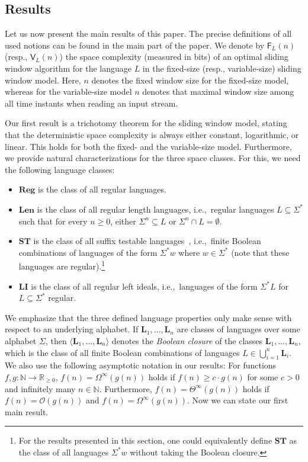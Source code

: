 \documentclass{article}\usepackage[a4paper,margin=20mm]{geometry}
\newcommand{\N}{\mathbb{N}}
\renewcommand{\O}{\mathcal{O}}
\newcommand{\F}{\mathsf{F}}
\newcommand{\V}{\mathsf{V}}
\newcommand{\Reg}{\mathbf{Reg}}
\newcommand{\Len}{\mathbf{Len}}
\newcommand{\LI}{\mathbf{LI}}
\newcommand{\ST}{\mathbf{ST}}
\renewcommand{\geq}{\geqslant}
\renewcommand{\ge}{\geq}
\newcommand{\Omegainf}{\Omega^{\scriptscriptstyle{\infty}}}
\newcommand{\Thetainf}{\Theta^{\scriptscriptstyle{\infty}}}
\begin{document}
\subsection{Results} \label{sec-results}

Let us now present the main results of this paper.
The precise definitions of all used notions can be found in the main part of the paper.
We denote by $\F_L(n)$ (resp., $\V_L(n)$) the space complexity (measured in bits) of an optimal sliding window algorithm
for the language $L$ in the fixed-size (resp., variable-size) sliding window model.
Here, $n$ denotes the fixed window size for the fixed-size model, whereas for 
the variable-size model $n$ denotes that maximal window
size among all time instants when reading an input stream.

Our first result is a trichotomy theorem for the sliding window model,
stating that the deterministic space complexity is always
either constant, logarithmic, or linear.
This holds for both the fixed- and the variable-size model.
Furthermore, we provide natural characterizations for the three space classes. For this, we need
the following language classes:
\begin{itemize}
\item $\Reg$ is the class of all regular languages.
\item $\Len$ is the class of all regular length languages, i.e.,~regular languages $L\subseteq \Sigma^*$
such that for every $n \geq 0$, either $\Sigma^n \subseteq L$ or $\Sigma^n \cap L = \emptyset$.
\item $\ST$ is the class of all suffix testable languages~\cite[Section~5.3]{Pin97}, i.e.,~finite Boolean combinations of languages of the form $\Sigma^* w$ where $w \in \Sigma^*$
(note that these languages are regular).\footnote{For the results presented in this section, one could equivalently define $\ST$ as the class of all languages $\Sigma^* w$ without taking the Boolean closure.}
\item $\LI$ is the class of all regular left ideals, i.e.,~languages of the form $\Sigma^* L$ for $L\subseteq \Sigma^*$
regular.
\end{itemize}
We emphasize that the three defined language properties
only make sense with respect to an underlying alphabet.
If $\mathbf{L}_1, \dots, \mathbf{L}_n$ are classes of languages over some alphabet $\Sigma$,
then $\langle \mathbf{L}_1, \dots, \mathbf{L}_n \rangle$
denotes the {\em Boolean closure} of the classes $\mathbf{L}_1, \dots, \mathbf{L}_n$, which is
the class of all finite Boolean combinations of languages $L \in \bigcup_{i=1}^n\mathbf{L}_i$.
We also use the following asymptotic notation in our results:
For functions $f,g \colon \N \to \mathbb{R}_{\ge 0}$,
$f(n) = \Omegainf(g(n))$ holds if $f(n) \ge c \cdot g(n)$ for some $c > 0$ and
infinitely many $n \in \N$.
Furthermore, $f(n) = \Thetainf(g(n))$ holds if $f(n) = \O(g(n))$
and $f(n) = \Omegainf(g(n))$. Now we can state our first main result.
\end{document}
